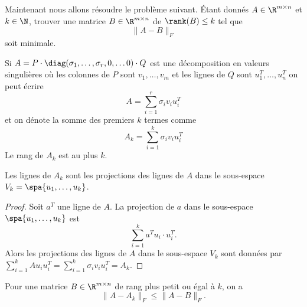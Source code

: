 Maintenant nous allons résoudre le problème suivant. Étant donnés $A \in \R^{m \times n}$ et $k \in \N$, trouver une matrice $B \in \R^{m \times n}$ de $\rank(B) \leq  k$ tel que 
\begin{displaymath}
  \|A - B\|_F
\end{displaymath}
soit minimale. 

Si $A = P \cdot \diag(\sigma_1,\dots,\sigma_r,0,\dots 0) \cdot Q$ est une décomposition en valeurs singulières où les colonnes de $P$ sont $v_1,\dots,v_m$ et les lignes de $Q$ sont $u_1^T,\dots,u_n^T$ on peut écrire
\begin{equation}
  \label{eq:18}
  A = \sum_{i=1}^r \sigma_i v_iu_i^T
\end{equation}
et on dénote la somme des premiers $k$ termes comme 
\begin{displaymath}
  A_k = \sum_{i=1}^k \sigma_i v_iu_i^T
\end{displaymath}
Le rang de $A_k$ est au plus $k$. 

\begin{lemma}
  \label{lem:12}
  Les lignes de $A_k$ sont les projections des lignes de $A$ dans le sous-espace $V_k = \spa\{u_1,\dots,u_k\}$. 
\end{lemma}

\begin{proof}
  Soit $a^T$ une ligne de $A$. La projection de $a$ dans le sous-espace $\spa\{u_1,\dots,u_k\}$ est 
  \begin{displaymath}
    \sum_{i=1}^k a^Tu_i \cdot u^T_i.
  \end{displaymath}
Alors les projections des lignes de $A$ dans le sous-espace $V_k$ sont données par $\sum_{i=1}^k A u_i u_i^T = \sum_{i=1}^k \sigma_i v_i u_i^T = A_k$.  
\end{proof}

\begin{theorem}
  \label{thr:27}
  Pour une matrice $B \in \R^{m \times n}$ de rang plus petit ou égal à $k$, on a 
  \begin{displaymath}
    \|A - A_k\|_F \leq \|A - B\|_F.
  \end{displaymath}
\end{theorem}

